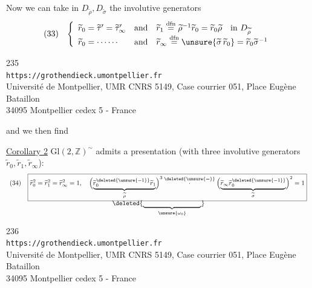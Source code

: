Now we can take in $D_{\widetilde\rho},D_{\widetilde\sigma}$ the involutive generators
\[
\begin{array}{ll}
(33)&\left\{\begin{array}{lll}
\widetilde r_0=\widetilde\tau'=\widetilde\tau'_\infty&\text{and}&
\widetilde r_1\overset{\mathrm{dfn}}{=}\widetilde\rho^{-1}\widetilde r_0=\widetilde r_0\widetilde\rho\quad\text{in }D_{\widetilde\rho}\\
\widetilde r_0=\cdots\cdots&\text{and}&
\widetilde r_\infty\overset{\mathrm{dfn}}{=}\unsure{\widetilde\sigma\,\widetilde r_0}=\widetilde r_0\widetilde\sigma^{-1}
\end{array}\right.
\end{array}
\]


\begin{center}
235\\
\texttt{https://grothendieck.umontpellier.fr}\\
Université de Montpellier, UMR CNRS 5149, Case courrier 051, Place Eugène Bataillon\\
34095 Montpellier cedex 5 - France
\end{center}


and we then find

\uline{Corollary 2} $\mathrm{Gl}(2,\mathbb Z)^{\sim}$ admits a presentation (with three involutive generators $\widetilde r_0,\widetilde r_1,\widetilde r_\infty$):
\[
\begin{array}{ll}
(34)&\boxed{\widetilde r_0^2=\widetilde r_1^2=\widetilde r_\infty^2=1,\quad
\Bigl(\underbrace{\widetilde r_0^{\deleted{\unsure{-1}}}\widetilde r_1}_{\widetilde\rho}\Bigr)^3
\overset{\deleted{\unsure{=}}}{\cdot}
\Bigl(\underbrace{\widetilde r_\infty\widetilde r_0^{\deleted{\unsure{-1}}}}_{\widetilde\sigma}\Bigr)^2=1}\\[-2pt]
&\hspace{13em}\deleted{\underbrace{\hspace{9em}}_{\unsure{\omega_0}}}
\end{array}
\]


\begin{center}
236\\
\texttt{https://grothendieck.umontpellier.fr}\\
Université de Montpellier, UMR CNRS 5149, Case courrier 051, Place Eugène Bataillon\\
34095 Montpellier cedex 5 - France
\end{center}


